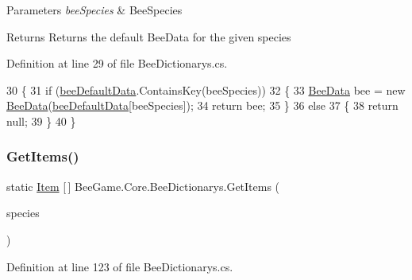 \begin{DoxyParams}{Parameters}
{\em bee\+Species} & Bee\+Species\\
\hline
\end{DoxyParams}
\begin{DoxyReturn}{Returns}
Returns the default Bee\+Data for the given species
\end{DoxyReturn}


Definition at line 29 of file Bee\+Dictionarys.\+cs.


\begin{DoxyCode}
30         \{
31             \textcolor{keywordflow}{if} (\hyperlink{class_bee_game_1_1_core_1_1_bee_dictionarys_a4bd3dbe3fc155e206801656c07212a96}{beeDefaultData}.ContainsKey(beeSpecies))
32             \{
33                 \hyperlink{struct_bee_game_1_1_bee_1_1_bee_data}{BeeData} bee = \textcolor{keyword}{new} \hyperlink{struct_bee_game_1_1_bee_1_1_bee_data}{BeeData}(\hyperlink{class_bee_game_1_1_core_1_1_bee_dictionarys_a4bd3dbe3fc155e206801656c07212a96}{beeDefaultData}[beeSpecies]);
34                 \textcolor{keywordflow}{return} bee;
35             \}
36             \textcolor{keywordflow}{else}
37             \{
38                 \textcolor{keywordflow}{return} null;
39             \}
40         \}
\end{DoxyCode}
\mbox{\label{class_bee_game_1_1_core_1_1_bee_dictionarys_a2cd137701cfdcfeb25d5e7a73397e1b4}} 
\subsubsection{\texorpdfstring{Get\+Items()}{GetItems()}}
{\footnotesize\ttfamily static \hyperlink{struct_bee_game_1_1_items_1_1_item}{Item} \mbox{[}$\,$\mbox{]} Bee\+Game.\+Core.\+Bee\+Dictionarys.\+Get\+Items (\begin{DoxyParamCaption}\item[{\hyperlink{namespace_bee_game_1_1_enums_aa2ead984825678d83c42d48f6382619c}{Bee\+Species}}]{species }\end{DoxyParamCaption})\hspace{0.3cm}{\ttfamily [static]}}



Definition at line 123 of file Bee\+Dictionarys.\+cs.


